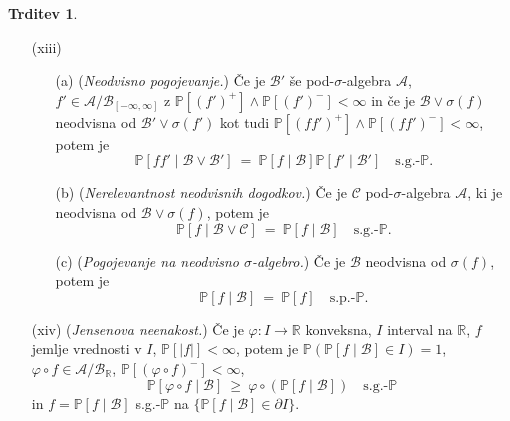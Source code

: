 \documentclass[11pt]{article}
\newcommand{\R}{\mathbb{R}}
\renewcommand{\P}{\mathbb{P}}
\newcommand{\A}{\mathcal{A}}
\newcommand{\BB}{\mathcal{B}}
\newcommand{\CC}{\mathcal{C}}
\newcommand{\B}{\mathscr{B}}
\newcommand{\set}[1]{\{#1\}}
\newcommand{\1}{\mathbbm{1}}
\newcommand{\rr}{[-\infty,\infty]}
\theoremstyle{definition}
\theoremstyle{definition}
\newtheorem{trditev}{Trditev}[section]
\theoremstyle{definition}
\theoremstyle{definition}
\begin{document}
\begin{trditev}
\begin{enumerate}
\item[(xiii)] 
\begin{itemize}
	\item[(a)] (\textit{Neodvisno pogojevanje.}) Če je $\BB'$ še pod-$\sigma$-algebra $\A$, \hbox{$f' \in \A/\B_{\rr}$} z $\P[(f')^+]\wedge\P[(f')^-]<\infty$ in če je $\BB\vee\sigma(f)$ neodvisna od \hbox{$\BB'\vee\sigma(f')$} kot tudi $\P[(ff')^+]\wedge\P[(ff')^-]<\infty$, potem je
	$$\P[ff' \mid \BB\vee\BB'] ~=~ \P[f \mid \BB]\P[f' \mid \BB'] \quad \text{s.g.-}\P.$$
	\item[(b)] (\textit{Nerelevantnost neodvisnih dogodkov.}) Če je $\CC$ pod-$\sigma$-algebra $\A$, ki je neodvisna od $\BB\vee\sigma(f)$, potem je
	$$\P[f \mid \BB\vee\CC] ~=~ \P[f \mid \BB] \quad \text{s.g.-}\P.$$
	\item[(c)] (\textit{Pogojevanje na neodvisno $\sigma$-algebro.}) Če je $\BB$ neodvisna od $\sigma(f)$, potem je
	$$\P[f \mid \BB] ~=~ \P[f] \quad \text{s.p.-}\P.$$
\end{itemize}

\item[(xiv)] (\textit{Jensenova neenakost.}) Če je $\varphi: I \rightarrow \R$ konveksna, $I$ interval na $\R$, $f$ jemlje vrednosti v $I$, $\P[|f|]<\infty$, potem je $\P(\P[f \mid \BB] \in I) = 1$, $\varphi \circ f \in \A/\B_\R$, $\P[(\varphi \circ f)^-]<\infty$,
$$\P[\varphi \circ f \mid \BB] ~\geq~ \varphi \circ (\P[f \mid \BB]) \quad \text{s.g.-}\P$$
in $f = \P[f \mid \BB]$ s.g.-$\P$ na $\set{\P[f \mid \BB] \in \partial I}$.

\end{enumerate}

\end{trditev}
\vspace{0.5cm}
\end{document}
